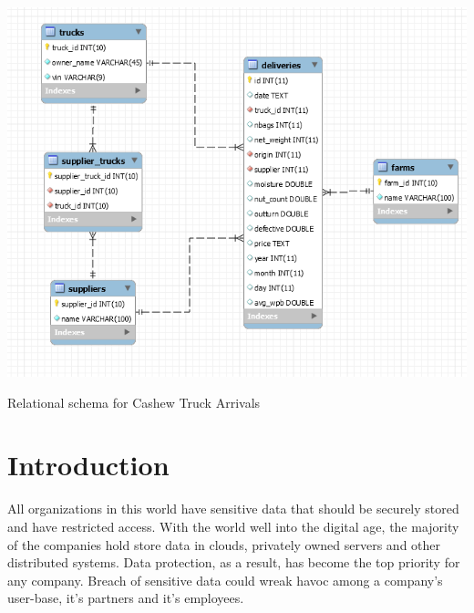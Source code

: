 \documentclass[sigconf]{acmart}
\begin{document}


\begin{teaserfigure}
  \includegraphics[width=\textwidth]{cashew_erd.png}
  \caption{Relational schema for Cashew Truck Arrivals}
  \label{fig:teaser}
\end{teaserfigure}


\maketitle

\section{Introduction}

All organizations in this world have sensitive data that should be securely stored and have restricted access. With the world well into the digital age, the majority of the companies hold store data in clouds, privately owned servers and other distributed systems. Data protection, as a result, has become the top priority for any company. Breach of sensitive data could wreak havoc among a company's user-base, it's partners and it's employees.
\end{document}
